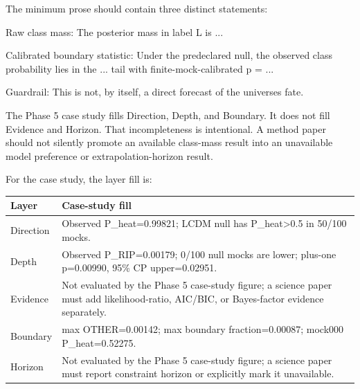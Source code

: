 \documentclass[
]{article}
\newenvironment{Shaded}{}{}
\newcommand{\NormalTok}[1]{#1}
\newcounter{none} %
\begin{document}
The minimum prose should contain three distinct statements:

\begin{Shaded}
\begin{Highlighting}[]
\NormalTok{Raw class mass:}
\NormalTok{The posterior mass in label L is ...}

\NormalTok{Calibrated boundary statistic:}
\NormalTok{Under the predeclared null, the observed class probability lies in the ...}
\NormalTok{tail with finite{-}mock{-}calibrated p = ...}

\NormalTok{Guardrail:}
\NormalTok{This is not, by itself, a direct forecast of the universe\textquotesingle{}s fate.}
\end{Highlighting}
\end{Shaded}

The Phase 5 case study fills Direction, Depth, and Boundary. It does not
fill Evidence and Horizon. That incompleteness is intentional. A method
paper should not silently promote an available class-mass result into an
unavailable model preference or extrapolation-horizon result.

For the case study, the layer fill is:

{\def\LTcaptype{none} %
\begin{longtable}[]{@{}
  >{\raggedright\arraybackslash}p{}
  >{\raggedright\arraybackslash}p{}@{}}
\toprule\noalign{}
\begin{minipage}[b]{\linewidth}\raggedright
Layer
\end{minipage} & \begin{minipage}[b]{\linewidth}\raggedright
Case-study fill
\end{minipage} \\
\midrule\noalign{}
\endhead
\bottomrule\noalign{}
\endlastfoot
Direction & Observed P\_heat=0.99821; LCDM null has
P\_heat\textgreater0.5 in 50/100 mocks. \\
Depth & Observed P\_RIP=0.00179; 0/100 null mocks are lower; plus-one
p=0.00990, 95\% CP upper=0.02951. \\
Evidence & Not evaluated by the Phase 5 case-study figure; a science
paper must add likelihood-ratio, AIC/BIC, or Bayes-factor evidence
separately. \\
Boundary & max OTHER=0.00142; max boundary fraction=0.00087; mock000
P\_heat=0.52275. \\
Horizon & Not evaluated by the Phase 5 case-study figure; a science
paper must report constraint horizon or explicitly mark it
unavailable. \\
\end{longtable}
}
\end{document}
